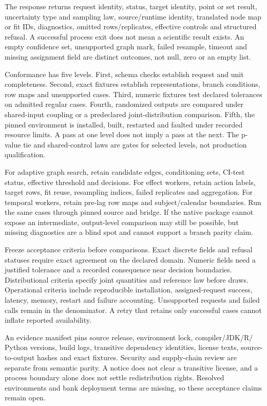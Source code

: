 The response returns request identity, status, target identity, point or set
result, uncertainty type and sampling law, source/runtime identity, translated
node map or fit IDs, diagnostics, omitted rows/replicates, effective controls
and structured refusal. A successful process exit does not mean a scientific
result exists. An empty confidence set, unsupported graph mark, failed
resample, timeout and missing assignment field are distinct outcomes, not null,
zero or an empty list.

Conformance has five levels. First, schema checks establish request and unit
completeness. Second, exact fixtures establish representations, branch
conditions, row maps and unsupported cases. Third, numeric fixtures test
declared tolerances on admitted regular cases. Fourth, randomized outputs are
compared under shared-input coupling or a predeclared joint-distribution
comparison. Fifth, the pinned environment is installed, built, restarted and
faulted under recorded resource limits. A pass at one level does not imply a
pass at the next. The p-value tie and shared-control laws are gates for selected
levels, not production qualification.

For adaptive graph search, retain candidate edges, conditioning sets, CI-test
status, effective threshold and decisions. For effect workers, retain action
labels, target rows, fit reuse, resampling indices, failed replicates and
aggregation. For temporal workers, retain pre-lag row maps and subject/calendar
boundaries. Run the same cases through pinned source and bridge. If the native
package cannot expose an intermediate, output-level comparison may still be
possible, but missing diagnostics are a blind spot and cannot support a branch
parity claim.

Freeze acceptance criteria before comparisons. Exact discrete fields and
refusal statuses require exact agreement on the declared domain. Numeric fields
need a justified tolerance and a recorded consequence near decision
boundaries. Distributional criteria specify joint quantities and reference
law before draws. Operational criteria include reproducible installation,
assigned-request success, latency, memory, restart and failure accounting.
Unsupported requests and failed calls remain in the denominator. A retry that
retains only successful cases cannot inflate reported availability.

An evidence manifest pins source release, environment lock, compiler/JDK/R/
Python versions, build logs, transitive dependency identities, license texts,
source-to-output hashes and exact fixtures. Security and supply-chain review
are separate from semantic parity. A notice does not clear a transitive
license, and a process boundary alone does not settle redistribution rights.
Resolved environments and bank deployment terms are missing, so these
acceptance claims remain open.

